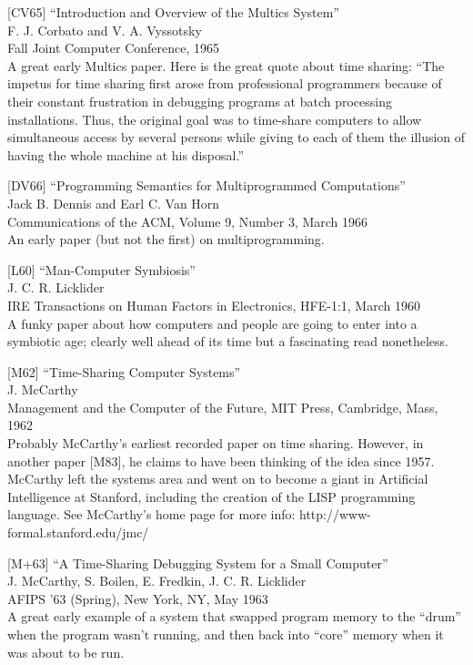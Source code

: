 {[}CV65{]} ``Introduction and Overview of the Multics System''\\
F. J. Corbato and V. A. Vyssotsky\\
Fall Joint Computer Conference, 1965\\
A great early Multics paper. Here is the great quote about time sharing:
``The impetus for time sharing first arose from professional programmers
because of their constant frustration in debugging programs at batch
processing installations. Thus, the original goal was to time-share
computers to allow simultaneous access by several persons while giving
to each of them the illusion of having the whole machine at his
disposal.''

{[}DV66{]} ``Programming Semantics for Multiprogrammed Computations''\\
Jack B. Dennis and Earl C. Van Horn\\
Communications of the ACM, Volume 9, Number 3, March 1966\\
An early paper (but not the first) on multiprogramming.

{[}L60{]} ``Man-Computer Symbiosis''\\
J. C. R. Licklider\\
IRE Transactions on Human Factors in Electronics, HFE-1:1, March 1960\\
A funky paper about how computers and people are going to enter into a
symbiotic age; clearly well ahead of its time but a fascinating read
nonetheless.

{[}M62{]} ``Time-Sharing Computer Systems''\\
J. McCarthy\\
Management and the Computer of the Future, MIT Press, Cambridge, Mass,
1962\\
Probably McCarthy's earliest recorded paper on time sharing. However, in
another paper {[}M83{]}, he claims to have been thinking of the idea
since 1957. McCarthy left the systems area and went on to become a giant
in Artificial Intelligence at Stanford, including the creation of the
LISP programming language. See McCarthy's home page for more info:
http://www-formal.stanford.edu/jmc/

{[}M+63{]} ``A Time-Sharing Debugging System for a Small Computer''\\
J. McCarthy, S. Boilen, E. Fredkin, J. C. R. Licklider\\
AFIPS '63 (Spring), New York, NY, May 1963\\
A great early example of a system that swapped program memory to the
``drum'' when the program wasn't running, and then back into ``core''
memory when it was about to be run.

